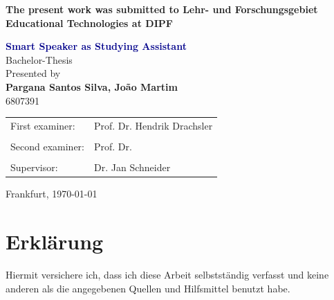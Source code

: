 \documentclass[twoside,11pt,titlepage,a4paper,english,bibliography=totocnumbered,listof=numbered]{scrbook}[2019/07/29]
\begin{document}
\begin{titlepage}
	\strut
	\hfill
	\vspace{0.5cm}
	\begin{flushleft}
		\begin{spacing}{.9}
			\large
			\textbf{The present work was submitted to Lehr- und Forschungsgebiet Educational Technologies at DIPF}
		\end{spacing}
		\vspace{2cm}
		\Huge
		\textcolor{DarkBlue}{\textbf{Smart Speaker as Studying Assistant}}\\
		\large
		\vspace{2cm} 
	 	Bachelor-Thesis\\
	 	\vspace{2cm} 
	 	Presented by\\
	 	\vspace{0.3cm} 
	 	\textbf{Pargana Santos Silva, João Martim}\\
	 	\vspace{0.3cm} 
	 	6807391\\
	 	\vspace{2.5cm}
	 	\begin{tabular}{ll}
	 		First examiner: & Prof. Dr. Hendrik Drachsler\\
	 		\\
	 		Second examiner: & Prof. Dr. \\
	 		\\
	 		Supervisor: & Dr. Jan Schneider \\

	 	\end{tabular}
	 	
	\end{flushleft}
	\begin{flushright}
		\vspace{2.5cm} 
	 	Frankfurt, \today\\
	\end{flushright}

\end{titlepage}
\thispagestyle{empty}

\cleardoublepage

\newpage
\thispagestyle{empty}
\section*{Erklärung}
Hiermit versichere ich, dass ich diese Arbeit selbst\-ständig verfasst und keine anderen als die angegebenen Quellen und Hilfsmittel benutzt habe. \\
\end{document}
